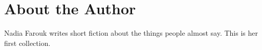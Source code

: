 \chapter{About the Author}
Nadia Farouk writes short fiction about the things people almost say.
This is her first collection.
